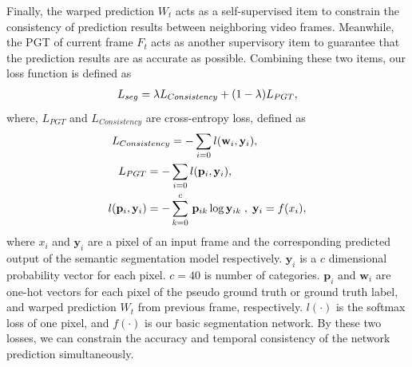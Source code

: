 Finally, the warped prediction $W_{t}$ acts as a self-supervised item to constrain the consistency of prediction results between neighboring video frames.
%
Meanwhile, the PGT of current frame $F_t$ acts as another supervisory item to guarantee that the prediction results are as accurate as possible.
Combining these two items, our loss function is defined as
\begin{equation}
\centering
\begin{aligned}
L_{seg}= \lambda L_{Consistency} +(1-\lambda)L_{PGT},
\end{aligned}
\end{equation}
%
where, ${L_{PGT}}$ and ${L_{Consistency}}$ are cross-entropy loss, defined as
\begin{equation}
{
\vspace*{-0.6cm} 
\centering     
\begin{aligned} 
L_{Consistency} &= -\sum_{i=0} l(\mathbf{w}_i,\mathbf{y}_i),\\
L_{PGT} = -&\sum_{i=0} l(\mathbf{p}_i,\mathbf{y}_i), \\
l(\mathbf{p}_i,\mathbf{y}_i) = -&\sum_{k=0}^c \,\mathbf{p}_{ik}\log{\mathbf{y}_{ik}}\;,\; \mathbf{y}_{i} = f(x_{i}),\\
\end{aligned}
}
\end{equation}
%
where ${x_i}$ and ${\mathbf{y}_i}$ are a pixel of an input frame and the corresponding predicted output of the semantic segmentation model respectively. 
%
$\mathbf{y}_i$ is a $c$ dimensional probability vector for each pixel.
${c}=40$ is number of categories.
%
${\mathbf{p}_i}$ and ${\mathbf{w}_i}$ are one-hot vectors for each pixel of the pseudo ground truth or ground truth label, and warped prediction $W_{t}$ from previous frame, respectively. 
%
${l(\cdot)}$ is the softmax loss of one pixel, and ${f(\cdot)}$ is our basic segmentation network. 
%
By these two losses, we can constrain the accuracy and temporal consistency of the network prediction simultaneously.
